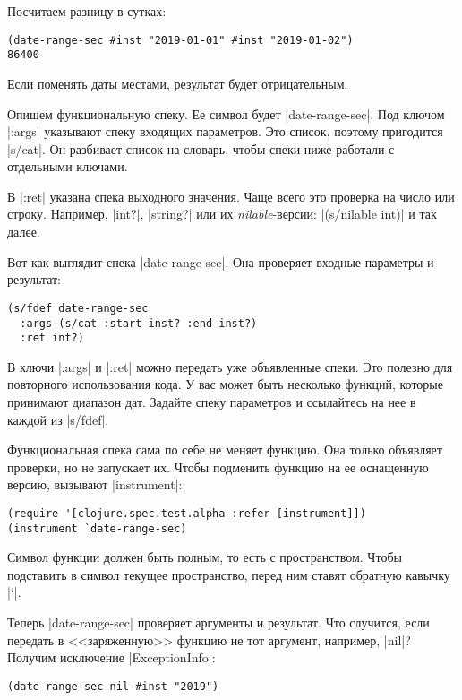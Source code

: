 Посчитаем разницу в сутках:

\begin{verbatim}
(date-range-sec #inst "2019-01-01" #inst "2019-01-02")
86400
\end{verbatim}

\noindent
Если поменять даты местами, результат будет отрицательным.

Опишем функциональную спеку. Ее символ будет \spverb|date-range-sec|. Под ключом
\spverb|:args| указывают спеку входящих параметров. Это список, поэтому пригодится
\spverb|s/cat|. Он разбивает список на словарь, чтобы спеки ниже работали
с отдельными ключами.

В \spverb|:ret| указана спека выходного значения. Чаще всего это проверка на число
или строку. Например, \spverb|int?|, \spverb|string?| или их \emph{nilable}-версии:
\spverb|(s/nilable int)| и так далее.

Вот как выглядит спека \spverb|date-range-sec|. Она проверяет входные параметры
и результат:

\begin{verbatim}
(s/fdef date-range-sec
  :args (s/cat :start inst? :end inst?)
  :ret int?)
\end{verbatim}

В ключи \spverb|:args| и \spverb|:ret| можно передать уже объявленные спеки. Это
полезно для повторного использования кода. У вас может быть несколько функций,
которые принимают диапазон дат. Задайте спеку параметров и ссылайтесь на нее в
каждой из \spverb|s/fdef|.

Функциональная спека сама по себе не меняет функцию. Она только объявляет проверки,
но не запускает их. Чтобы подменить функцию на ее оснащенную версию, вызывают
\spverb|instrument|:

\begin{verbatim}
(require '[clojure.spec.test.alpha :refer [instrument]])
(instrument `date-range-sec)
\end{verbatim}

Символ функции должен быть полным, то есть с пространством. Чтобы подставить в
символ текущее пространство, перед ним ставят обратную кавычку \spverb|`|.

Теперь \spverb|date-range-sec| проверяет аргументы и результат. Что
случится, если передать в <<заряженную>> функцию не тот аргумент, например,
\spverb|nil|? Получим исключение \spverb|ExceptionInfo|:

\begin{verbatim}
(date-range-sec nil #inst "2019")
\end{verbatim}

